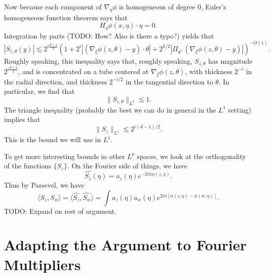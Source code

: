 Now because each component of $\nabla_\eta \phi$ is homogeneous of degree $0$, Euler's homogeneous function theorem says that
%
\[ H_\eta \phi(x,\eta) \cdot \eta = 0. \]
%
Integration by parts (TODO: How? Also is there a typo?) yields that
%
\[ |S_{z,\theta}(y)| \lesssim 2^{i \frac{d+1}{2}} \left( 1 + 2^i |(\nabla_\xi \phi(z,\theta) - y) \cdot \theta| + 2^{k/2} | \Pi_{\theta^\perp}( \nabla_\xi \phi(z,\theta) - y ) | \right)^{-O(1)}. \]
%
Roughly speaking, this inequality says that, roughly speaking, $S_{z,\theta}$ has magnitude $2^{i \frac{d+1}{2}}$, and is concentrated on a tube centered at $\nabla_\xi \phi(z,\theta)$, with thickness $2^{-i}$ in the radial direction, and thickness $2^{-i/2}$ in the tangential direction to $\theta$. In particular, we find that
%
\[ \| S_{z,\theta} \|_{L^1} \lesssim 1. \]
%
The triangle inequality (probably the best we can do in general in the $L^1$ setting) implies that
%
\[ \| S_z \|_{L^1} \lesssim 2^{i(d-1)/2}. \]
%
This is the bound we will use in $L^1$.

To get more interesting bounds in other $L^p$ spaces, we look at the orthogonality of the functions $\{ S_z \}$. On the Fourier side of things, we have
%
\[ \widehat{S_z}(\eta) = a_z(\eta) e^{- 2 \pi i \phi(z,\eta)}. \]
%
Thus by Parsevel, we have
%
\[ \langle S_z, S_w \rangle = \langle \widehat{S_z}, \widehat{S_w} \rangle = \int a_z(\eta) a_w(\eta) e^{2 \pi i [ \phi(z,\eta) - \phi(w,\eta) ]}. \]
%
TODO: Expand on rest of argument.

\section{Adapting the Argument to Fourier Multipliers}

